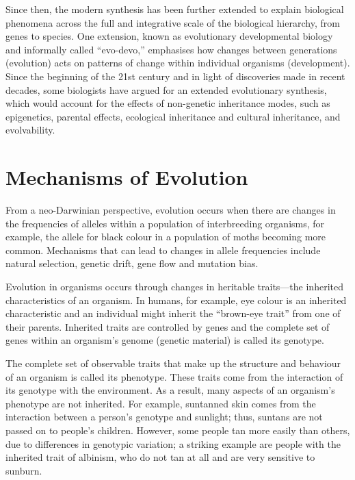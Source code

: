 Since then, the modern synthesis has been further extended to explain biological phenomena across the full and integrative scale of the biological hierarchy, from genes to species. One extension, known as evolutionary developmental biology and informally called ``evo-devo,'' emphasises how changes between generations (evolution) acts on patterns of change within individual organisms (development). Since the beginning of the 21st century and in light of discoveries made in recent decades, some biologists have argued for an extended evolutionary synthesis, which would account for the effects of non-genetic inheritance modes, such as epigenetics, parental effects, ecological inheritance and cultural inheritance, and evolvability.

\hypertarget{mechanisms-of-evolution}{%
\section{Mechanisms of Evolution}\label{mechanisms-of-evolution}}

From a neo-Darwinian perspective, evolution occurs when there are changes in the frequencies of alleles within a population of interbreeding organisms, for example, the allele for black colour in a population of moths becoming more common. Mechanisms that can lead to changes in allele frequencies include natural selection, genetic drift, gene flow and mutation bias.

Evolution in organisms occurs through changes in heritable traits---the inherited characteristics of an organism. In humans, for example, eye colour is an inherited characteristic and an individual might inherit the ``brown-eye trait'' from one of their parents. Inherited traits are controlled by genes and the complete set of genes within an organism's genome (genetic material) is called its genotype.

The complete set of observable traits that make up the structure and behaviour of an organism is called its phenotype. These traits come from the interaction of its genotype with the environment. As a result, many aspects of an organism's phenotype are not inherited. For example, suntanned skin comes from the interaction between a person's genotype and sunlight; thus, suntans are not passed on to people's children. However, some people tan more easily than others, due to differences in genotypic variation; a striking example are people with the inherited trait of albinism, who do not tan at all and are very sensitive to sunburn.

